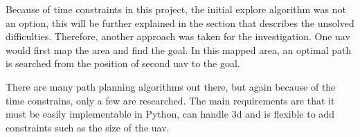 Because of time constraints in this project, the initial explore algorithm was not an option, this will be further explained in the section that describes the unsolved difficulties. Therefore, another approach was taken for the investigation. One \acs{uav} would first map the area and find the goal. In this mapped area, an optimal path is searched from the position of second \acs{uav} to the goal.

There are many path planning algorithms out there, but again because of the time constrains, only a few are researched. The main requirements are that it must be easily implementable in Python, can handle \acs{3d} and is flexible to add constraints such as the size of the \acs{uav}.